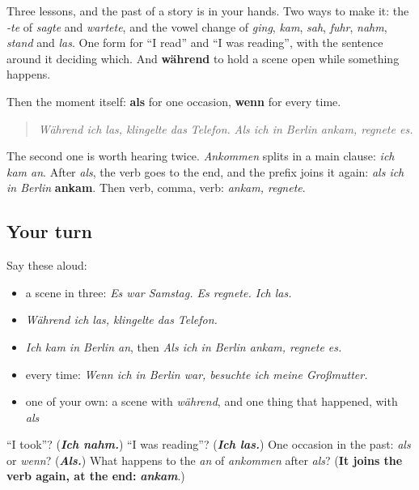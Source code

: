 \begin{grammarlens}[title={What you've built}]
Three lessons, and the past of a story is in your hands. Two ways to make it: the \emph{-te} of \emph{sagte} and \emph{wartete}, and the vowel change of \emph{ging}, \emph{kam}, \emph{sah}, \emph{fuhr}, \emph{nahm}, \emph{stand} and \emph{las}. One form for \textquotedblleft{}I read\textquotedblright{} and \textquotedblleft{}I was reading\textquotedblright{}, with the sentence around it deciding which. And \textbf{während} to hold a scene open while something happens.

Then the moment itself: \textbf{als} for one occasion, \textbf{wenn} for every time.

\begin{quote}
\emph{Während ich las, klingelte das Telefon.} \emph{Als ich in Berlin ankam, regnete es.}
\end{quote}

The second one is worth hearing twice. \emph{Ankommen} splits in a main clause: \emph{ich kam an}. After \emph{als}, the verb goes to the end, and the prefix joins it again: \emph{als ich in Berlin} \textbf{ankam}. Then verb, comma, verb: \emph{ankam, regnete}.
\end{grammarlens}

\subsection*{Your turn}
Say these aloud:

\begin{itemize}
\raggedright
  \item a scene in three: \emph{Es war Samstag. Es regnete. Ich las.}
  \item \emph{Während ich las, klingelte das Telefon.}
  \item \emph{Ich kam in Berlin an}, then \emph{Als ich in Berlin ankam, regnete es.}
  \item every time: \emph{Wenn ich in Berlin war, besuchte ich meine Großmutter.}
  \item one of your own: a scene with \emph{während}, and one thing that happened, with \emph{als}
\end{itemize}

\begin{tcolorbox}[breakable,colback=teal!4,colframe=teal!35!black,title={Before you move on}]
\textquotedblleft{}I took\textquotedblright{}? (\emph{\textbf{Ich nahm.}}) \textquotedblleft{}I was reading\textquotedblright{}? (\emph{\textbf{Ich las.}}) One occasion in the past: \emph{als} or \emph{wenn}? (\emph{\textbf{Als.}}) What happens to the \emph{an} of \emph{ankommen} after \emph{als}? (\textbf{It joins the verb again, at the end:} \emph{\textbf{ankam}}.)
\end{tcolorbox}
